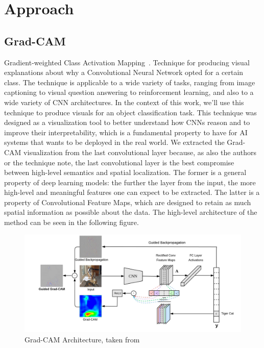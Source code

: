 \documentclass[../main.tex]{subfiles}
\begin{document}
    \chapter{Approach}

    \section{Grad-CAM}
    Gradient-weighted Class Activation Mapping~\cite{gradcam}. Technique for producing visual explanations
    about why a Convolutional Neural Network opted for a certain class. The technique is applicable to a wide
    variety of tasks, ranging from image captioning to visual question answering to reinforcement learning, and
    also to a wide variety of CNN architectures. In the context of this work, we'll use this technique to
    produce visuals for an object classification task.
    This technique was designed as a visualization tool to better understand how CNNs reason and to improve
    their interpretability, which is a fundamental property to have for AI systems that wants to be deployed
    in the real world.
    We extracted the Grad-CAM visualization from the last convolutional layer because, as also the authors
    or the technique note, the last convolutional layer is the best compromise between high-level semantics and spatial
    localization. The former is a general property of deep learning models: the further the layer from the input,
    the more high-level and meaningful features one can expect to be extracted. The latter is a property of
    Convolutional Feature Maps, which are designed to retain as much spatial information as possible about
    the data.
    The high-level architecture of the method can be seen in the following figure.

	\begin{figure}[h!]
    	\includegraphics[width=\linewidth]{img/gradcam-architecture.png}
	    \caption{Grad-CAM Architecture, taken from~\cite{gradcam}}\label{fig:gradcam-architecture}
	\end{figure}
\end{document}
